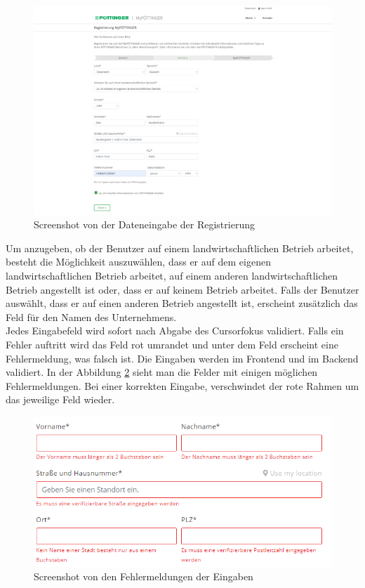 \begin{figure}[H]
	\centerline{
		\includegraphics[width=1\textwidth, frame]{./grafiken/erm_register_data.png}
	}
	\vskip0pt
	\caption{Screenshot von der Dateneingabe der Registrierung} \label{fig:register2}
\end{figure}

Um anzugeben, ob der Benutzer auf einem landwirtschaftlichen Betrieb arbeitet, besteht die Möglichkeit auszuwählen, dass er auf dem eigenen landwirtschaftlichen Betrieb arbeitet, auf einem anderen landwirtschaftlichen Betrieb angestellt ist oder, dass er auf keinem Betrieb arbeitet. Falls der Benutzer auswählt, dass er auf einen anderen Betrieb angestellt ist, erscheint zusätzlich das Feld für den Namen des Unternehmens.\\
Jedes Eingabefeld wird sofort nach Abgabe des Cursorfokus validiert. Falls ein Fehler auftritt wird das Feld rot umrandet und unter dem Feld erscheint eine Fehlermeldung, was falsch ist. Die Eingaben werden im Frontend und im Backend validiert. In der Abbildung \ref{fig:eingabeError} sieht man die Felder mit einigen möglichen Fehlermeldungen. Bei einer korrekten Eingabe, verschwindet der rote Rahmen um das jeweilige Feld wieder.
\begin{figure}[H]
	\centerline{
		\includegraphics[width=1\textwidth, frame]{./grafiken/dateneingabe_Errors.PNG}
	}
	\vskip0pt
	\caption{Screenshot von den Fehlermeldungen der Eingaben} \label{fig:eingabeError}
\end{figure}

